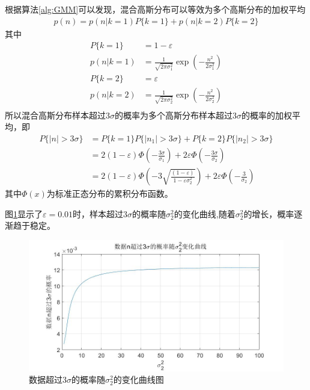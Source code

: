 \documentclass[fontset=windows]{article}
\numberwithin{figure}{section}
\begin{document}
根据算法\ref*{alg:GMM}可以发现，混合高斯分布可以等效为多个高斯分布的加权平均
\begin{align*}
	p(n)=p(n|k=1)P\{k=1\}+p(n|k=2)P\{k=2\}
\end{align*}
其中
\begin{align*}
	P\{k=1\} & =1-\varepsilon                                                             \\
	p(n|k=1) & =\frac{1}{\sqrt{2\pi \sigma^2_1}}\exp\left(-\frac{n^2}{2\sigma^2_1}\right) \\
	P\{k=2\} & =\varepsilon                                                               \\
	p(n|k=2) & =\frac{1}{\sqrt{2\pi \sigma^2_2}}\exp\left(-\frac{n^2}{2\sigma^2_2}\right) \\
\end{align*}
所以混合高斯分布样本超过\(3\sigma\)的概率为多个高斯分布样本超过\(3\sigma\)的概率的加权平均，即
\begin{align*}
	P\{\vert n\vert>3\sigma\}
	 & =P\{k=1\}P\{\vert n_1\vert>3\sigma\}+P\{k=2\}P\{\vert n_2\vert>3\sigma\}                                              \\
	 & =2(1-\varepsilon)\Phi(-\frac{3\sigma}{\sigma_1})+2\varepsilon \Phi(-\frac{3\sigma}{\sigma_2})                         \\
	 & =2(1-\varepsilon)\Phi(-3\sqrt{\frac{(1-\varepsilon)}{1-\varepsilon\sigma_2^2}})+2\varepsilon\Phi(-\frac{3}{\sigma_2})
\end{align*}
其中\(\Phi(x)\)为标准正态分布的累积分布函数。

图\ref*{fig:4}显示了\(\varepsilon=0.01\)时，样本超过\(3\sigma\)的概率随\(\sigma^2_2\)的变化曲线,随着\(\sigma^2_2\)的增长，概率逐渐趋于稳定。

\begin{figure}[H]
	\centering
	\includegraphics[scale=0.4]{4.jpg}
	\caption{数据超过\(3\sigma\)的概率随\(\sigma^2_2\)的变化曲线图}
	\label{fig:4}
\end{figure}
\end{document}
